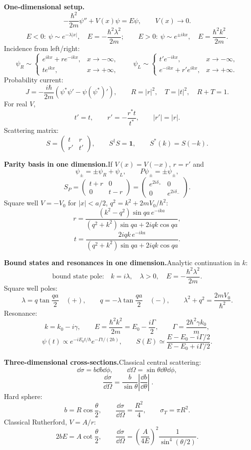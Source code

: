 \noindent\textbf{One-dimensional setup.}\quad
\[
-\frac{\hbar^2}{2m}\psi''+V(x)\psi=E\psi,\qquad V(x)\to0.
\]
\[
E<0:\ \psi\sim e^{-\lambda|x|},\quad E=-\frac{\hbar^2\lambda^2}{2m};
\qquad
E>0:\ \psi\sim e^{\pm ikx},\quad E=\frac{\hbar^2k^2}{2m}.
\]
Incidence from left/right:
\[
\psi_R\sim
\begin{cases}
e^{ikx}+re^{-ikx},&x\to-\infty,\\
te^{ikx},&x\to+\infty,
\end{cases}
\qquad
\psi_L\sim
\begin{cases}
t'e^{-ikx},&x\to-\infty,\\
e^{-ikx}+r'e^{ikx},&x\to+\infty.
\end{cases}
\]
Probability current:
\[
J=-\frac{i\hbar}{2m}(\psi^*\psi'-\psi(\psi^*)'),\qquad
R=|r|^2,\quad T=|t|^2,\quad R+T=1.
\]
For real $V$,
\[
t'=t,\qquad r'=-\frac{r^*t}{t^*},\qquad |r'|=|r|.
\]
Scattering matrix:
\[
S=\begin{pmatrix}t&r\\ r'&t'\end{pmatrix},\qquad
S^\dagger S=\mathbf{1},\qquad S^*(k)=S(-k).
\]

\noindent\textbf{Parity basis in one dimension.}\quad If $V(x)=V(-x)$,
$r=r'$ and
\[
\psi_\pm=\pm\psi_R+\psi_L,\qquad P\psi_\pm=\pm\psi_\pm,
\]
\[
S_P=\begin{pmatrix}t+r&0\\0&t-r\end{pmatrix}
=\begin{pmatrix}e^{2i\delta_+}&0\\0&e^{2i\delta_-}\end{pmatrix}.
\]
Square well $V=-V_0$ for $|x|<a/2$, $q^2=k^2+2mV_0/\hbar^2$:
\[
r=\frac{(k^2-q^2)\sin qa\,e^{-ika}}
{(q^2+k^2)\sin qa+2iqk\cos qa},
\]
\[
t=\frac{2iqk\,e^{-ika}}{(q^2+k^2)\sin qa+2iqk\cos qa}.
\]

\noindent\textbf{Bound states and resonances in one dimension.}\quad Analytic
continuation in $k$:
\[
\text{bound state pole:}\quad k=i\lambda,\quad \lambda>0,\quad
E=-\frac{\hbar^2\lambda^2}{2m}.
\]
Square well poles:
\[
\lambda=q\tan\frac{qa}{2}\quad(+),\qquad
q=-\lambda\tan\frac{qa}{2}\quad(-),\qquad
\lambda^2+q^2=\frac{2mV_0}{\hbar^2}.
\]
Resonance:
\[
k=k_0-i\gamma,\qquad
E=\frac{\hbar^2k^2}{2m}=E_0-\frac{i\Gamma}{2},\qquad
\Gamma=\frac{2\hbar^2\gamma k_0}{m},
\]
\[
\psi(t)\propto e^{-iE_0t/\hbar}e^{-\Gamma t/(2\hbar)},\qquad
S(E)\simeq\frac{E-E_0-i\Gamma/2}{E-E_0+i\Gamma/2}.
\]

\noindent\textbf{Three-dimensional cross-sections.}\quad Classical central scattering:
\[
\dd\sigma=b\dd b\dd\phi,\qquad \dd\Omega=\sin\theta\dd\theta\dd\phi,
\]
\[
\boxed{\;\frac{\dd\sigma}{\dd\Omega}
=\frac{b}{\sin\theta}\left|\frac{\dd b}{\dd\theta}\right|\;}.
\]
Hard sphere:
\[
b=R\cos\frac{\theta}{2},\qquad
\frac{\dd\sigma}{\dd\Omega}=\frac{R^2}{4},\qquad
\sigma_T=\pi R^2.
\]
Classical Rutherford, $V=A/r$:
\[
2bE=A\cot\frac{\theta}{2},\qquad
\frac{\dd\sigma}{\dd\Omega}
=\left(\frac{A}{4E}\right)^2\frac1{\sin^4(\theta/2)}.
\]

